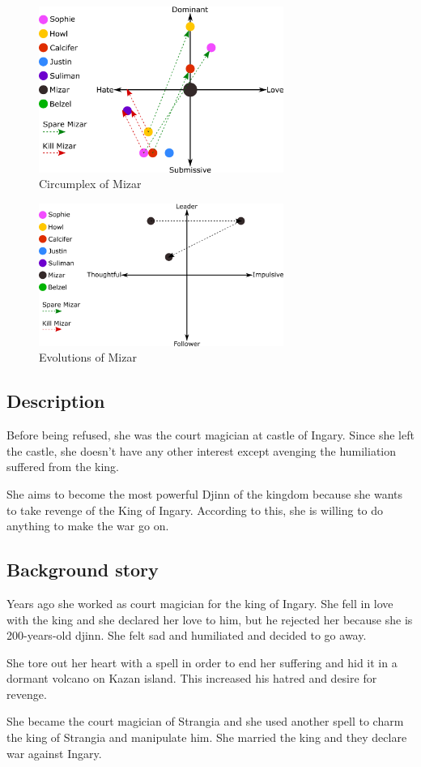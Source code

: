 \begin{figure}[H]
  \centering
  \includegraphics[width=8cm]{Images/SVG/Exported/Circumplexes/mizarCircumplex}
  \caption{Circumplex of Mizar}
\end{figure}

\begin{figure}[H]
  \centering
  \includegraphics[width=8cm]{Images/SVG/Exported/Evolutions/mizarEvolution}
  \caption{Evolutions of Mizar}
\end{figure}

\subsection{Description}
Before being refused, she was the court magician at castle of Ingary. Since she left the castle, she doesn't have any other interest except avenging the humiliation suffered from the king.

She aims to become the most powerful Djinn of the kingdom because she wants to take revenge of the King of Ingary. According to this, she is willing to do anything to make the war go on.

\subsection{Background story}
Years ago she worked as court magician for the king of Ingary. She fell in love with the king and she declared her love to him, but he rejected her because she is 200-years-old djinn. She felt sad and humiliated and decided to go away.

She tore out her heart with a spell in order to end her suffering and hid it in a dormant volcano on Kazan island. This increased his hatred and desire for revenge.

She became the court magician of Strangia and she used another spell to charm the king of Strangia and manipulate him. She married the king and they declare war against Ingary.
